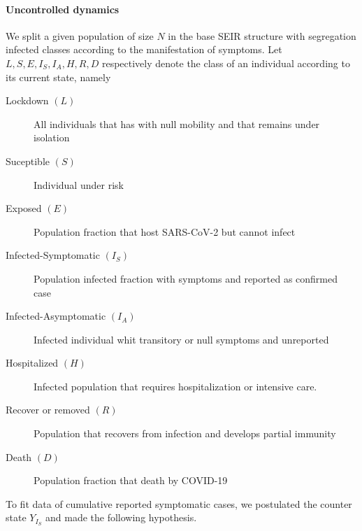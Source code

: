 \paragraph{Uncontrolled dynamics}
    We split a given population of size $N$ in the base SEIR
structure with segregation infected classes according to the manifestation
of symptoms. Let $L, S, E, I_S, I_A, H, R, D$ respectively denote the
class of an individual according to its current state, namely
%
\begin{description}
    \item[Lockdown $(L)$]
        All individuals that has with null mobility and that remains under
        isolation
    \item[Suceptible $(S)$]
        Individual under risk
    \item[Exposed $(E)$]
        Population fraction that host SARS-CoV-2 but cannot infect
    \item[Infected-Symptomatic $(I_S)$]
        Population infected fraction with symptoms and reported as confirmed
        case
    \item[Infected-Asymptomatic $(I_A)$]
        Infected individual whit transitory or null symptoms and unreported
    \item[Hospitalized $(H)$]
        Infected population that requires hospitalization or intensive care.
    \item[Recover or removed $(R)$]
        Population that recovers from infection and develops partial immunity
    \item[Death $(D)$]
        Population fraction that death by COVID-19
\end{description}
%
To fit data of cumulative reported symptomatic cases, we
postulated the counter state $Y_{I_S}$ and made the following hypothesis.
%
%
